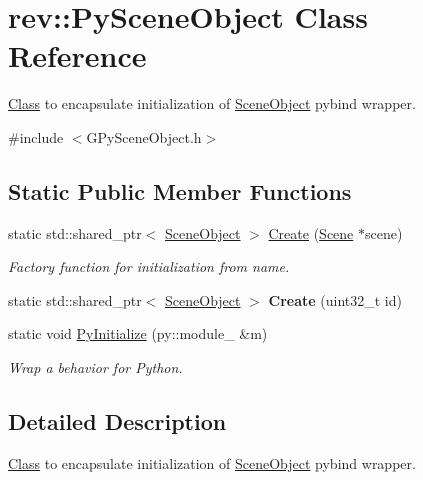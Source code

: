 \hypertarget{classrev_1_1_py_scene_object}{}\section{rev\+::Py\+Scene\+Object Class Reference}
\label{classrev_1_1_py_scene_object}


\mbox{\hyperlink{struct_class}{Class}} to encapsulate initialization of \mbox{\hyperlink{classrev_1_1_scene_object}{Scene\+Object}} pybind wrapper.  




{\ttfamily \#include $<$G\+Py\+Scene\+Object.\+h$>$}

\subsection*{Static Public Member Functions}
\begin{DoxyCompactItemize}
\item 
static std\+::shared\+\_\+ptr$<$ \mbox{\hyperlink{classrev_1_1_scene_object}{Scene\+Object}} $>$ \mbox{\hyperlink{classrev_1_1_py_scene_object_a4ecffceb96613e99540c4fe42077bb7b}{Create}} (\mbox{\hyperlink{classrev_1_1_scene}{Scene}} $\ast$scene)
\begin{DoxyCompactList}\small\item\em Factory function for initialization from name. \end{DoxyCompactList}\item 
\mbox{\label{classrev_1_1_py_scene_object_a0abb13043f28db794d512e9b77151e9a}} 
static std\+::shared\+\_\+ptr$<$ \mbox{\hyperlink{classrev_1_1_scene_object}{Scene\+Object}} $>$ {\bfseries Create} (uint32\+\_\+t id)
\item 
\mbox{\label{classrev_1_1_py_scene_object_a26614b982a187b4b6a961e9be353a522}} 
static void \mbox{\hyperlink{classrev_1_1_py_scene_object_a26614b982a187b4b6a961e9be353a522}{Py\+Initialize}} (py\+::module\+\_\+ \&m)
\begin{DoxyCompactList}\small\item\em Wrap a behavior for Python. \end{DoxyCompactList}\end{DoxyCompactItemize}


\subsection{Detailed Description}
\mbox{\hyperlink{struct_class}{Class}} to encapsulate initialization of \mbox{\hyperlink{classrev_1_1_scene_object}{Scene\+Object}} pybind wrapper. 


